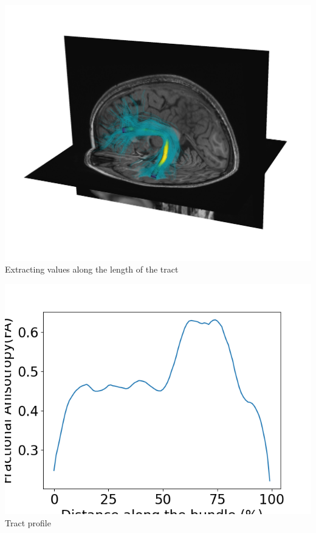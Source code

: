 \documentclass[a0paper,landscape,fontscale=0.385]{baposter}
\newenvironment{Figure}
  {\par\medskip\noindent\minipage{\linewidth}}
  {\endminipage\par\medskip}
\begin{document}
\begin{poster}
{\begin{multicols}{4}
    \columnbreak
    \begin{Figure}
        \centering
        \includegraphics[width=1.0\linewidth]{arc_profile_trk.png}
        Extracting values along the length of the tract
    \end{Figure}
    \columnbreak
    \begin{Figure}
        \vspace{0.25cm}
        \centering
        \includegraphics[width=1.0\linewidth]{tract_profile.png}
        Tract profile
    \end{Figure}

    \vspace{2em}
\end{multicols}
\vspace{-0.5em}
}


\end{poster}
\end{document}
